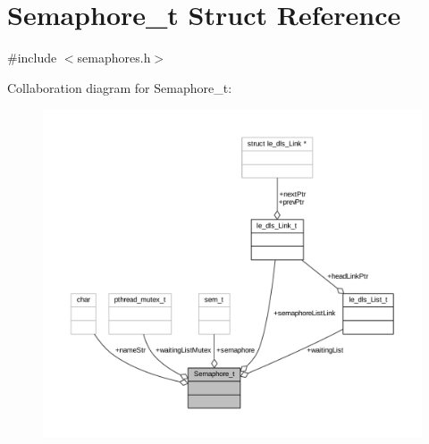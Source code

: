 \hypertarget{struct_semaphore__t}{}\section{Semaphore\+\_\+t Struct Reference}
\label{struct_semaphore__t}


{\ttfamily \#include $<$semaphores.\+h$>$}



Collaboration diagram for Semaphore\+\_\+t\+:
\nopagebreak
\begin{figure}[H]
\begin{center}
\leavevmode
\includegraphics[width=350pt]{struct_semaphore__t__coll__graph}
\end{center}
\end{figure}
